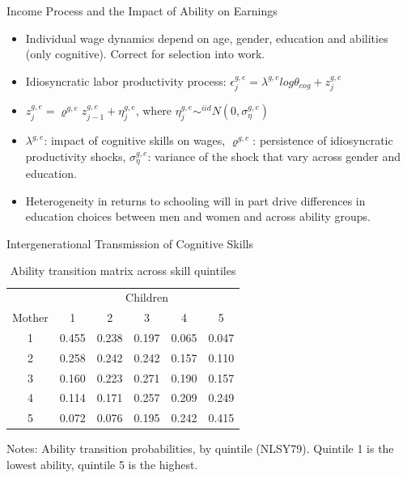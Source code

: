 \documentclass{beamer}
\begin{document}
\begin{frame}[label=Income1]{Income Process and the Impact of Ability on Earnings}
\hyperlink{Return4}{}
\begin{itemize}
\item Individual wage dynamics depend on age, gender, education and abilities (only cognitive). Correct for selection into work.
\item Idiosyncratic labor productivity process: $\epsilon_j^{g,e}=\lambda^{g,e}log\theta_{cog} + z_j^{g,e} $
\item $z_j^{g,e} =\varrho^{g,e}z_{j-1}^{g,e} + \eta_j^{g,e}$, where $\eta_j^{g,e}\sim^{iid} N(0, \sigma_{\eta}^{g,e})$
\item $\lambda^{g,e}$: impact of cognitive skills on wages, $\varrho^{g,e}$: persistence of idiosyncratic productivity shocks, $ \sigma_{\eta}^{g,e}$: variance of the shock that vary across gender and education. 
\item Heterogeneity in returns to schooling will in part drive differences in education choices between men and women and across ability groups.
\end{itemize}

\end{frame}

\begin{frame}[label=Transmission2]{Intergenerational Transmission of Cognitive Skills}
\hyperlink{Return5}{}

\begin {table}[H]
\caption {Ability transition matrix across skill quintiles } \label{tab:title} 
\begin{center}
  \begin{tabular}{c | c  c  c  c  c}
      \hline
     & \multicolumn{5}{c}{Children} \\ 

    Mother & 1 & 2 & 3 & 4 & 5 \\ \hline
1&0.455 & 0.238& 0.197& 0.065& 0.047 \\ 
2 &0.258& 0.242& 0.242 &0.157 &0.110\\ 
3& 0.160& 0.223& 0.271 &0.190 &0.157\\ 
4 &0.114& 0.171& 0.257& 0.209 &0.249\\ 
5 &0.072& 0.076 &0.195& 0.242 &0.415\\  \hline
\end{tabular}
\end{center}

\tiny{Notes: Ability transition probabilities, by quintile (NLSY79). Quintile 1 is the lowest ability, quintile 5 is the highest.}
\end {table}



\end{frame}
\end{document}
